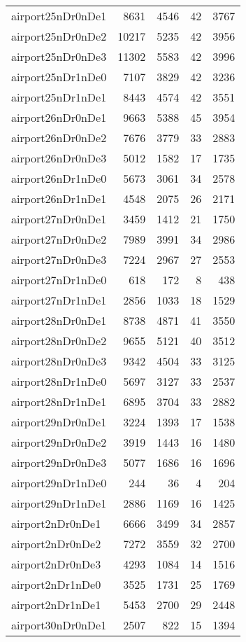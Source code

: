 \begin{longtable}{lrrrr}
airport25nDr0nDe1 & 8631 & 4546 & 42 & 3767 \\
airport25nDr0nDe2 & 10217 & 5235 & 42 & 3956 \\
airport25nDr0nDe3 & 11302 & 5583 & 42 & 3996 \\
airport25nDr1nDe0 & 7107 & 3829 & 42 & 3236 \\
airport25nDr1nDe1 & 8443 & 4574 & 42 & 3551 \\
airport26nDr0nDe1 & 9663 & 5388 & 45 & 3954 \\
airport26nDr0nDe2 & 7676 & 3779 & 33 & 2883 \\
airport26nDr0nDe3 & 5012 & 1582 & 17 & 1735 \\
airport26nDr1nDe0 & 5673 & 3061 & 34 & 2578 \\
airport26nDr1nDe1 & 4548 & 2075 & 26 & 2171 \\
airport27nDr0nDe1 & 3459 & 1412 & 21 & 1750 \\
airport27nDr0nDe2 & 7989 & 3991 & 34 & 2986 \\
airport27nDr0nDe3 & 7224 & 2967 & 27 & 2553 \\
airport27nDr1nDe0 & 618 & 172 & 8 & 438 \\
airport27nDr1nDe1 & 2856 & 1033 & 18 & 1529 \\
airport28nDr0nDe1 & 8738 & 4871 & 41 & 3550 \\
airport28nDr0nDe2 & 9655 & 5121 & 40 & 3512 \\
airport28nDr0nDe3 & 9342 & 4504 & 33 & 3125 \\
airport28nDr1nDe0 & 5697 & 3127 & 33 & 2537 \\
airport28nDr1nDe1 & 6895 & 3704 & 33 & 2882 \\
airport29nDr0nDe1 & 3224 & 1393 & 17 & 1538 \\
airport29nDr0nDe2 & 3919 & 1443 & 16 & 1480 \\
airport29nDr0nDe3 & 5077 & 1686 & 16 & 1696 \\
airport29nDr1nDe0 & 244 & 36 & 4 & 204 \\
airport29nDr1nDe1 & 2886 & 1169 & 16 & 1425 \\
airport2nDr0nDe1 & 6666 & 3499 & 34 & 2857 \\
airport2nDr0nDe2 & 7272 & 3559 & 32 & 2700 \\
airport2nDr0nDe3 & 4293 & 1084 & 14 & 1516 \\
airport2nDr1nDe0 & 3525 & 1731 & 25 & 1769 \\
airport2nDr1nDe1 & 5453 & 2700 & 29 & 2448 \\
airport30nDr0nDe1 & 2507 & 822 & 15 & 1394 \\

\end{longtable}

